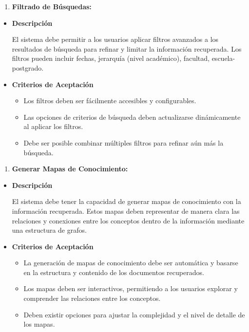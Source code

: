 \documentclass[
  12pt,
  openany]{book}
\providecommand{\tightlist}{%
  \setlength{\itemsep}{0pt}\setlength{\parskip}{0pt}}
\begin{document}
\begin{enumerate}
\def\labelenumi{\arabic{enumi}.}
\setcounter{enumi}{2}
\tightlist
\item
  \textbf{Filtrado de Búsquedas:}
\end{enumerate}

\begin{itemize}
\item
  \textbf{Descripción}

  El sistema debe permitir a los usuarios aplicar filtros avanzados a los resultados de búsqueda para refinar y limitar la información recuperada. Los filtros pueden incluir fechas, jerarquía (nivel académico), facultad, escuela-postgrado.
\item
  \textbf{Criterios de Aceptación}

  \begin{itemize}
  \item
    Los filtros deben ser fácilmente accesibles y configurables.
  \item
    Las opciones de criterios de búsqueda deben actualizarse dinámicamente al aplicar los filtros.
  \item
    Debe ser posible combinar múltiples filtros para refinar aún más la búsqueda.
  \end{itemize}
\end{itemize}

\begin{enumerate}
\def\labelenumi{\arabic{enumi}.}
\setcounter{enumi}{3}
\tightlist
\item
  \textbf{Generar Mapas de Conocimiento:}
\end{enumerate}

\begin{itemize}
\item
  \textbf{Descripción}

  El sistema debe tener la capacidad de generar mapas de conocimiento con la información recuperada. Estos mapas deben representar de manera clara las relaciones y conexiones entre los conceptos dentro de la información mediante una estructura de grafos.
\item
  \textbf{Criterios de Aceptación}

  \begin{itemize}
  \item
    La generación de mapas de conocimiento debe ser automática y basarse en la estructura y contenido de los documentos recuperados.
  \item
    Los mapas deben ser interactivos, permitiendo a los usuarios explorar y comprender las relaciones entre los conceptos.
  \item
    Deben existir opciones para ajustar la complejidad y el nivel de detalle de los mapas.
  \end{itemize}
\end{itemize}
\end{document}
